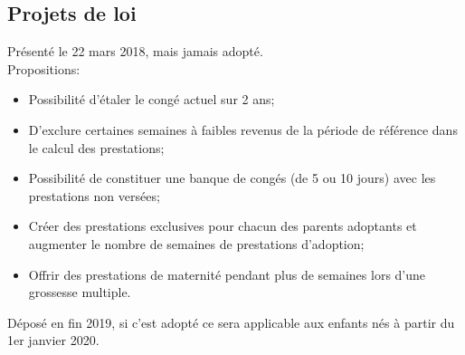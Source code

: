 \documentclass[10pt, french]{article}
\begin{document}
\begin{multicols*}{3}
\columnbreak
\subsection{Projets de loi}

\begin{definitionNOHFILLsub}
Présenté le 22 mars 2018, mais jamais adopté.\\

Propositions:
\begin{itemize}[leftmargin = *]
	\item	Possibilité d'étaler le congé actuel sur 2 ans;
	\item	D'exclure certaines semaines à faibles revenus de la période de référence dans le calcul des prestations;
	\item	Possibilité de constituer une banque de congés (de 5 ou 10 jours) avec les prestations non versées;
	\item	Créer des prestations exclusives pour chacun des parents adoptants et augmenter le nombre de semaines de prestations d'adoption;
	\item	Offrir des prestations de maternité pendant plus de semaines lors d'une grossesse multiple.
\end{itemize}
\end{definitionNOHFILLsub}

\begin{definitionNOHFILLsub}
Déposé en fin 2019, si c'est adopté ce sera applicable aux enfants nés à partir du 1er janvier 2020.\\


\end{definitionNOHFILLsub}
\end{multicols*}
\end{document}
